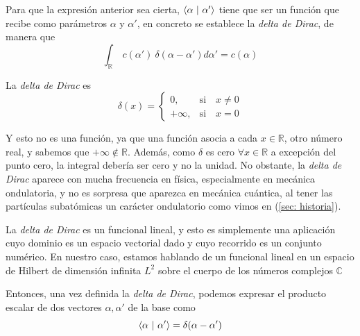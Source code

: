 \documentclass{article}
\numberwithin{equation}{section} %
\begin{document}
    \vspace{2.5mm}

    Para que la expresión anterior sea cierta, \( \braket{\alpha \ | \ \alpha'} \) tiene que ser un función que recibe como parámetros \( \alpha \) y \( \alpha' \), en concreto se establece la \textit{delta de Dirac}, de manera que
    \begin{equation*}
        \int_{\mathbb{R}} \ c (\alpha') \ \delta(\alpha - \alpha') d \alpha' = c (\alpha)
    \end{equation*}

    \vspace{2.5mm}

    La \textit{delta de Dirac} es
    \begin{equation}
        \delta(x) =
        \begin{cases}
            0, & \text{si} \quad x \neq 0 \\
            +\infty, & \text{si} \quad x = 0
        \end{cases}
    \end{equation}

    \vspace{2.5mm}

    Y esto no es una función, ya que una función asocia a cada \( x \in \mathbb{R} \), otro número real, y sabemos que \( +\infty \notin \mathbb{R} \). Además, como \( \delta \) es cero \( \forall x \in \mathbb{R} \) a excepción del punto cero, la integral debería ser cero y no la unidad. No obstante, la \textit{delta de Dirac} aparece con mucha frecuencia en física, especialmente en mecánica ondulatoria, y no es sorpresa que aparezca en mecánica cuántica, al tener las partículas subatómicas un carácter ondulatorio como vimos en (\ref{sec: historia}).

    \vspace{5mm}

    La \textit{delta de Dirac} es un funcional lineal, y esto es simplemente una aplicación cuyo dominio es un espacio vectorial dado y cuyo recorrido es un conjunto numérico. En nuestro caso, estamos hablando de un funcional lineal en un espacio de Hilbert de dimensión infinita \( L^{2} \) sobre el cuerpo de los números complejos \( \mathbb{C} \)

    \vspace{5mm}

    Entonces, una vez definida la \textit{delta de Dirac}, podemos expresar el producto escalar de dos vectores \( \alpha, \alpha' \) de la base como
    \begin{equation}
        \braket{\alpha \ | \ \alpha'} = \delta(\alpha - \alpha')
    \end{equation}
\end{document}
